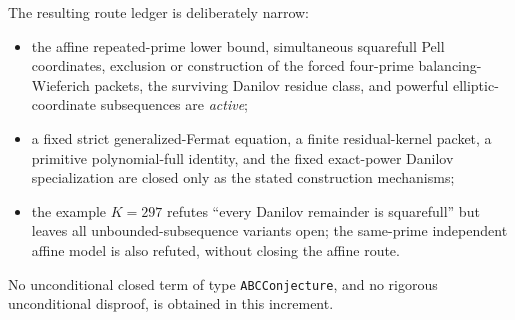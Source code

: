 The resulting route ledger is deliberately narrow:
\begin{itemize}
\item the affine repeated-prime lower bound, simultaneous squarefull Pell
coordinates, exclusion or construction of the forced four-prime
balancing-Wieferich packets, the surviving Danilov residue class, and powerful
elliptic-coordinate subsequences are \emph{active};
\item a fixed strict generalized-Fermat equation, a finite residual-kernel
packet, a primitive polynomial-full identity, and the fixed exact-power
Danilov specialization are closed only as the stated construction mechanisms;
\item the example $K=297$ refutes ``every Danilov remainder is squarefull''
but leaves all unbounded-subsequence variants open; the same-prime independent
affine model is also refuted, without closing the affine route.
\end{itemize}
No unconditional closed term of type \texttt{ABCConjecture}, and no rigorous
unconditional disproof, is obtained in this increment.
